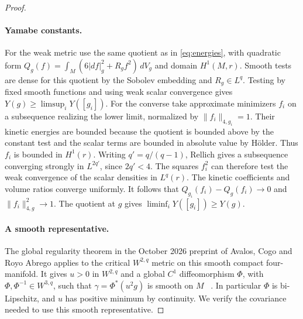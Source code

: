 \documentclass[11pt]{article}
\numberwithin{equation}{section}
\theoremstyle{definition}
\theoremstyle{remark}
\begin{document}
\begin{proof}
\paragraph{Yamabe constants.}
For the weak metric use the same quotient as in
\eqref{eq:energies}, with quadratic form
\(Q_g(f)=\int_M(6|df|_g^2+R_gf^2)\,dV_g\) and domain \(H^1(M,r)\).
Smooth tests are dense for this quotient by the Sobolev embedding and
\(R_g\in L^q\). Testing by fixed smooth functions and using weak scalar
convergence gives \(Y(g)\ge\limsup_i Y([g_i])\).
For the converse take approximate minimizers \(f_i\) on a subsequence
realizing the lower limit, normalized by \(\|f_i\|_{4,g_i}=1\).
Their kinetic energies are bounded because the quotient is bounded
above by the constant test and the scalar terms are bounded in
absolute value by Hölder. Thus \(f_i\) is bounded in \(H^1(r)\).
Writing \(q'=q/(q-1)\), Rellich gives a subsequence converging strongly
in \(L^{2q'}\), since \(2q'<4\). The squares \(f_i^2\) can therefore
test the weak convergence of the scalar densities in \(L^q(r)\).
The kinetic coefficients and volume ratios converge uniformly.
It follows that
\(Q_{g_i}(f_i)-Q_g(f_i)\to0\) and \(\|f_i\|_{4,g}^2\to1\).
The quotient at \(g\) gives \(\liminf_i Y([g_i])\ge Y(g)\).

\paragraph{A smooth representative.}
The global regularity theorem in the October 2026 preprint of
Avalos, Cogo and Royo Abrego applies to the critical \(W^{2,q}\) metric on this smooth compact
four-manifold. It gives \(u>0\) in \(W^{2,q}\) and a global \(C^1\)
diffeomorphism \(\Phi\), with \(\Phi,\Phi^{-1}\in W^{3,q}\), such that
\(\gamma=\Phi^*(u^2g)\) is smooth on \(M\)%
~\cite[Theorem 1.1, \S2.3 and \S5.1]{AvalosCogoRoyoAbrego2026Bach}.
In particular \(\Phi\) is bi-Lipschitz, and \(u\) has positive
minimum by continuity. We verify the covariance needed to use
this smooth representative.


\end{proof}
\end{document}
